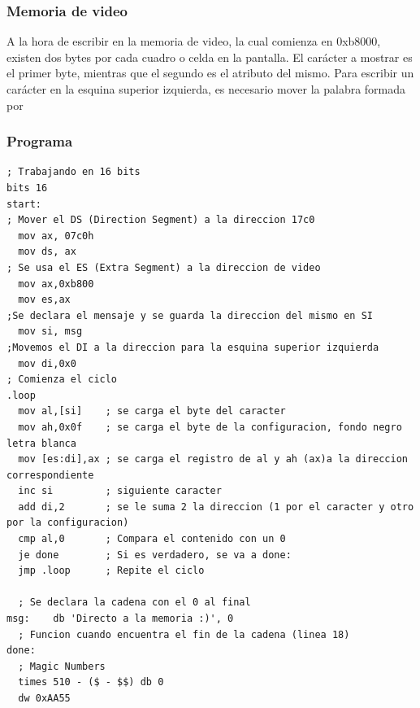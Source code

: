 \documentclass[12pt]{article}
\begin{document}
\subsubsection{Memoria de video}
A la hora de escribir en la memoria de video, la cual comienza en 0xb8000, existen dos bytes por cada cuadro o celda en la pantalla. El carácter a mostrar es el primer byte, mientras que el segundo es el atributo del mismo. Para escribir un carácter en la esquina superior izquierda, es necesario mover la palabra formada por \cite{dirMem}
\subsubsection{Programa}
\begin{verbatim}
; Trabajando en 16 bits
bits 16
start:
; Mover el DS (Direction Segment) a la direccion 17c0
  mov ax, 07c0h
  mov ds, ax
; Se usa el ES (Extra Segment) a la direccion de video
  mov ax,0xb800
  mov es,ax 
;Se declara el mensaje y se guarda la direccion del mismo en SI
  mov si, msg
;Movemos el DI a la direccion para la esquina superior izquierda
  mov di,0x0
; Comienza el ciclo
.loop
  mov al,[si]    ; se carga el byte del caracter
  mov ah,0x0f    ; se carga el byte de la configuracion, fondo negro letra blanca
  mov [es:di],ax ; se carga el registro de al y ah (ax)a la direccion correspondiente
  inc si         ; siguiente caracter
  add di,2       ; se le suma 2 la direccion (1 por el caracter y otro por la configuracion)
  cmp al,0       ; Compara el contenido con un 0
  je done        ; Si es verdadero, se va a done:
  jmp .loop      ; Repite el ciclo

  ; Se declara la cadena con el 0 al final
msg:	db 'Directo a la memoria :)', 0
  ; Funcion cuando encuentra el fin de la cadena (linea 18)
done:
  ; Magic Numbers
  times 510 - ($ - $$) db 0
  dw 0xAA55
\end{verbatim}
\end{document}
